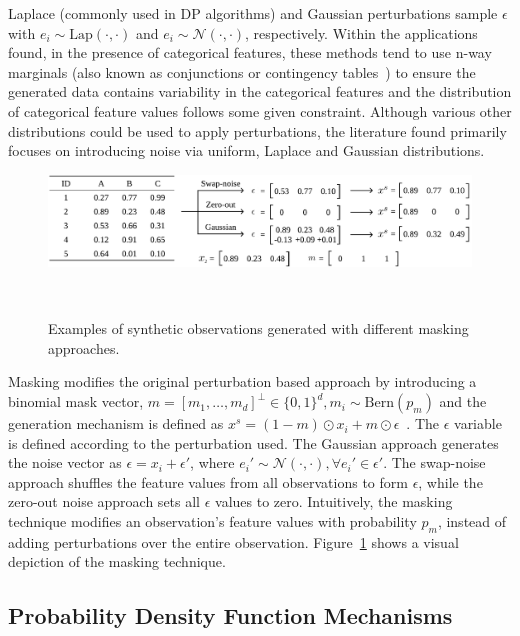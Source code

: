 \documentclass[parskip=full]{scrartcl}
\begin{document}
Laplace (commonly used in DP algorithms) and Gaussian perturbations sample
$\epsilon$ with $e_i \sim \text{Lap}(\cdot, \cdot)$ and $e_i \sim
\mathcal{N}(\cdot, \cdot)$, respectively. Within the applications found, in
the presence of categorical features, these methods tend to use n-way
marginals (also known as conjunctions or contingency
tables~\cite{gaboardi2014dual}) to ensure the generated data contains
variability in the categorical features and the distribution of categorical
feature values follows some given constraint.  Although various other
distributions could be used to apply perturbations, the literature found
primarily focuses on introducing noise via uniform, Laplace and Gaussian
distributions.

\begin{figure}
	\centering
	\includegraphics[width=1\linewidth]{../analysis/masking-example}
    \caption{Examples of synthetic observations generated with different
        masking approaches.
    }~\label{fig:masking-example}
\end{figure}

Masking modifies the original perturbation based approach by introducing a
binomial mask vector, $m = [m_1, \ldots, m_d]^\bot \in \{0,1\}^d, m_i \sim
\text{Bern}(p_m)$ and the generation mechanism is defined as $x^s = (1 -
m)\odot x_i + m \odot \epsilon$~\cite{yoon2020vime}. The $\epsilon$ variable
is defined according to the perturbation used. The Gaussian approach generates
the noise vector as $\epsilon = x_i + \epsilon'$, where $e_i' \sim
\mathcal{N}(\cdot, \cdot), \forall e_i' \in \epsilon'$. The swap-noise
approach shuffles the feature values from all observations to form
$\epsilon$, while the zero-out noise approach sets all $\epsilon$ values to
zero. Intuitively, the masking technique modifies an observation's feature
values with probability $p_m$, instead of adding perturbations over the
entire observation. Figure~\ref{fig:masking-example} shows a visual depiction
of the masking technique.

\subsection{Probability Density Function Mechanisms}
\end{document}
